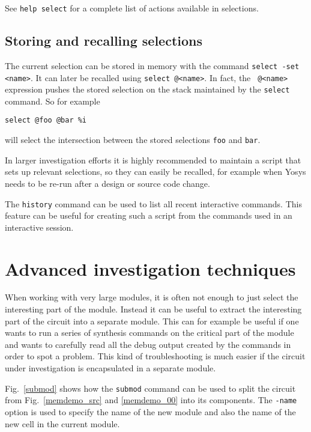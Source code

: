 \documentclass[9pt,technote,a4paper]{IEEEtran}
\begin{document}
See {\tt help select} for a complete list of actions available in selections.

\subsection{Storing and recalling selections}

The current selection can be stored in memory with the command {\tt select -set
<name>}. It can later be recalled using {\tt select @<name>}. In fact, the {\tt
@<name>} expression pushes the stored selection on the stack maintained by the
{\tt select} command. So for example

\begin{verbatim}
select @foo @bar %i
\end{verbatim}

will select the intersection between the stored selections {\tt foo} and {\tt bar}.

\medskip

In larger investigation efforts it is highly recommended to maintain a script that
sets up relevant selections, so they can easily be recalled, for example when
Yosys needs to be re-run after a design or source code change.

The {\tt history} command can be used to list all recent interactive commands.
This feature can be useful for creating such a script from the commands used in
an interactive session.

\section{Advanced investigation techniques}
\label{poke}

When working with very large modules, it is often not enough to just select the
interesting part of the module. Instead it can be useful to extract the
interesting part of the circuit into a separate module. This can for example be
useful if one wants to run a series of synthesis commands on the critical part
of the module and wants to carefully read all the debug output created by the
commands in order to spot a problem. This kind of troubleshooting is much easier
if the circuit under investigation is encapsulated in a separate module.

Fig.~\ref{submod} shows how the {\tt submod} command can be used to split the
circuit from Fig.~\ref{memdemo_src} and \ref{memdemo_00} into its components.
The {\tt -name} option is used to specify the name of the new module and
also the name of the new cell in the current module.
\end{document}
